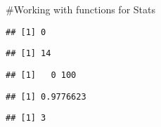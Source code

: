 \documentclass[]{article}
\newenvironment{Shaded}{\begin{snugshade}}{\end{snugshade}}
\newcommand{\FunctionTok}[1]{\textcolor[rgb]{0.00,0.00,0.00}{#1}}
\newcommand{\NormalTok}[1]{#1}
\newcommand{\SpecialCharTok}[1]{\textcolor[rgb]{0.00,0.00,0.00}{#1}}
\begin{document}
\#Working with functions for Stats

\begin{Shaded}
\end{Shaded}

\begin{verbatim}
## [1] 0
\end{verbatim}

\begin{Shaded}
\end{Shaded}

\begin{verbatim}
## [1] 14
\end{verbatim}

\begin{Shaded}
\end{Shaded}

\begin{verbatim}
## [1]   0 100
\end{verbatim}

\begin{Shaded}
\end{Shaded}

\begin{verbatim}
## [1] 0.9776623
\end{verbatim}

\begin{Shaded}
\end{Shaded}

\begin{verbatim}
## [1] 3
\end{verbatim}
\end{document}
